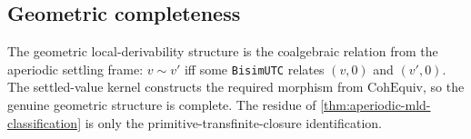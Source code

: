 \subsection{Geometric completeness}

\begin{theorem}\label{thm:geometric-mld-complete}\leanok{}
The geometric local-derivability structure is the coalgebraic relation from the
aperiodic settling frame: \(v\sim v'\) iff some \texttt{BisimUTC} relates
\((v,0)\) and \((v',0)\).  The settled-value kernel constructs the required
morphism from \(\mathrm{CohEquiv}\), so the genuine geometric structure is
complete.  The residue of \cref{thm:aperiodic-mld-classification} is only the
primitive-transfinite-closure identification.
\end{theorem}
